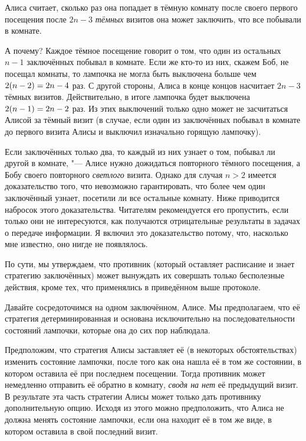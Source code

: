 \documentclass[twoside]{book}
\begin{document}
Алиса считает, сколько раз она попадает в тёмную комнату после своего первого 
посещения после $2n-3$ \emph{тёмных} визитов она может заключить, что все побывали в комнате.

А почему?
Каждое тёмное посещение говорит о том, что один из остальных $n-1$ заключённых побывал в комнате.
Если же кто-то из них, скажем Боб, не посещал комнаты, то лампочка не могла быть выключена больше чем $2(n-2)\z=2n-4$ раз.
С другой стороны, Алиса в конце концов насчитает $2n-3$ тёмных визитов.
Действительно, в итоге лампочка будет выключена $2(n-1)\z=2n-2$
раз.
Из этих выключений только одно может не засчитаться Алисой за тёмный визит (в случае, если один из заключённых побывал в комнате до первого визита Алисы и выключил изначально горящую лампочку).

Если заключённых только два, то каждый из них узнает о том, побывал ли другой в комнате, "---
Алисе нужно дожидаться повторного тёмного посещения, а Бобу своего повторного \emph{светлого} визита.
Однако для случая $n>2$ имеется доказательство того, что невозможно гарантировать, что более чем один заключённый узнает, посетили ли все остальные комнату.
Ниже приводится набросок этого доказательства.
Читателям рекомендуется его пропустить, если только они не интересуются, как получаются отрицательные результаты в задачах о передаче информации.
Я включил это доказательство потому, что, насколько мне известно, оно нигде не появлялось.

По сути, мы утверждаем, что противник (который оставляет расписание и знает стратегию заключённых) может вынуждать их совершать только бесполезные действия, кроме тех, что применялись в приведённом выше протоколе.

Давайте сосредоточимся на одном заключённом, Алисе.
Мы предполагаем, что её стратегия детерминированная и основана исключительно на последовательности состояний лампочки, которые она до сих пор наблюдала.

Предположим, что стратегия Алисы заставляет её (в некоторых обстоятельствах) изменить состояние лампочки, после того как она нашла её в том же состоянии, в котором оставила её при последнем посещении.
Тогда противник может немедленно отправить её обратно в комнату, \emph{сводя на нет} её предыдущий визит.
В результате эта часть стратегии Алисы может только дать противнику дополнительную опцию.
Исходя из этого можно предположить, что Алиса не должна менять состояние лампочки, если она находит её в том же виде, в котором оставила в свой последний визит.
\end{document}
